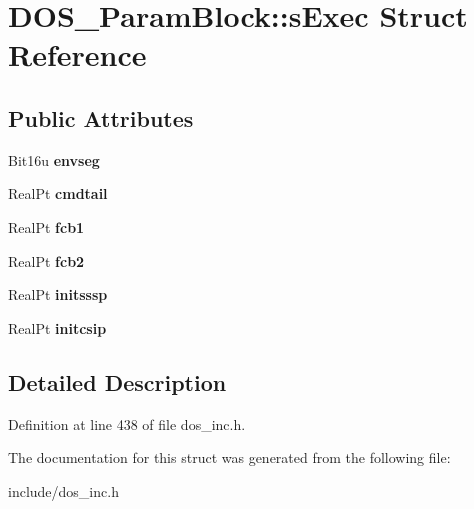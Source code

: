 \hypertarget{structDOS__ParamBlock_1_1sExec}{\section{D\-O\-S\-\_\-\-Param\-Block\-:\-:s\-Exec Struct Reference}
\label{structDOS__ParamBlock_1_1sExec}
}
\subsection*{Public Attributes}
\begin{DoxyCompactItemize}
\item 
\hypertarget{structDOS__ParamBlock_1_1sExec_ab687ac3ee3f86582a88216f428b86770}{Bit16u {\bfseries envseg}}\label{structDOS__ParamBlock_1_1sExec_ab687ac3ee3f86582a88216f428b86770}

\item 
\hypertarget{structDOS__ParamBlock_1_1sExec_ab6b6951382774b8c938f9428192c529d}{Real\-Pt {\bfseries cmdtail}}\label{structDOS__ParamBlock_1_1sExec_ab6b6951382774b8c938f9428192c529d}

\item 
\hypertarget{structDOS__ParamBlock_1_1sExec_a90a2f5095e246afb9c22e59625d47637}{Real\-Pt {\bfseries fcb1}}\label{structDOS__ParamBlock_1_1sExec_a90a2f5095e246afb9c22e59625d47637}

\item 
\hypertarget{structDOS__ParamBlock_1_1sExec_a07ee173102f3e88504b4c76674174243}{Real\-Pt {\bfseries fcb2}}\label{structDOS__ParamBlock_1_1sExec_a07ee173102f3e88504b4c76674174243}

\item 
\hypertarget{structDOS__ParamBlock_1_1sExec_a0541b0ed955144e206155d01815ab077}{Real\-Pt {\bfseries initsssp}}\label{structDOS__ParamBlock_1_1sExec_a0541b0ed955144e206155d01815ab077}

\item 
\hypertarget{structDOS__ParamBlock_1_1sExec_a9fd385a207f3887bc6e26973d2b11e8f}{Real\-Pt {\bfseries initcsip}}\label{structDOS__ParamBlock_1_1sExec_a9fd385a207f3887bc6e26973d2b11e8f}

\end{DoxyCompactItemize}


\subsection{Detailed Description}


Definition at line 438 of file dos\-\_\-inc.\-h.



The documentation for this struct was generated from the following file\-:\begin{DoxyCompactItemize}
\item 
include/dos\-\_\-inc.\-h\end{DoxyCompactItemize}
